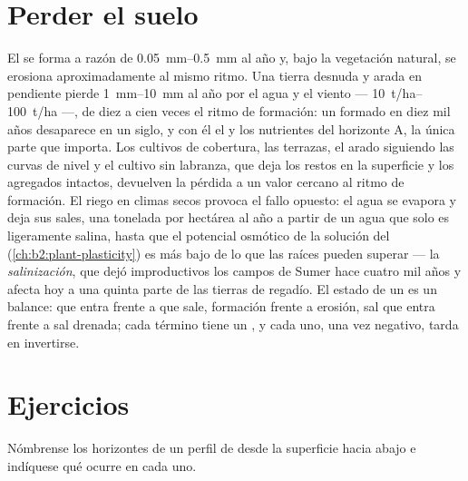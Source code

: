 \section{Perder el suelo}

\begin{proposition}\label{prop:b2:living-soil:erosion}
El  se forma a razón de \qtyrange{0.05}{0.5}{mm} al año y, bajo la
vegetación natural, se erosiona aproximadamente al mismo ritmo. Una tierra
desnuda y arada en pendiente pierde \qtyrange{1}{10}{mm} al año por el
agua y el viento ---
\qtyrange{10}{100}{t/ha} ---, de diez a cien veces el ritmo de formación:
un  formado en diez mil años desaparece en un siglo, y con él el
 y los nutrientes del horizonte A, la única parte que importa. Los
cultivos de cobertura, las terrazas, el arado siguiendo las curvas de
nivel y el cultivo sin labranza, que deja los restos en la superficie y
los agregados intactos, devuelven la pérdida a un valor cercano al ritmo
de formación. El riego en climas secos provoca el fallo opuesto: el agua
se evapora y deja sus sales, una tonelada por hectárea al año a partir de
un agua que solo es ligeramente salina, hasta que el potencial osmótico de
la solución del  (\cref{ch:b2:plant-plasticity}) es más bajo de lo que
las raíces pueden superar --- la \emph{salinización}, que dejó
improductivos los campos de Sumer hace cuatro mil años y afecta hoy a una
quinta parte de las tierras de regadío. El estado de un  es un
balance:  que entra frente a  que sale, formación frente a
erosión, sal que entra frente a sal drenada; cada término tiene un , y cada uno, una vez negativo, tarda en invertirse.
\end{proposition}

\section{Ejercicios}

\begin{exercise}[$\star$]\label{exo:b2:living-soil:1}
Nómbrense los horizontes de un perfil de  desde la superficie hacia
abajo e indíquese qué ocurre en cada uno.
\end{exercise}

